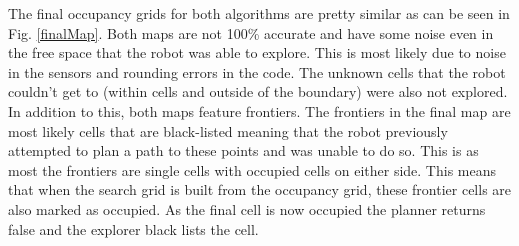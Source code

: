 \documentclass[a4paper,12pt]{article}
\begin{document}
		The final occupancy grids for both algorithms are pretty similar as can be seen in Fig. \ref{finalMap}. Both maps are not 100\% accurate  and have some noise even in the free space that the robot was able to explore. This is most likely due to noise in the sensors and rounding errors in the code. The unknown cells that the robot couldn't get to (within cells and outside of the boundary) were also not explored. In addition to this, both maps feature frontiers. The frontiers in the final map are most likely cells that are black-listed meaning that the robot previously attempted to plan a path to these points and was unable to do so. This is as most the frontiers are single cells with occupied cells on either side. This means that when the search grid is built from the occupancy grid, these frontier cells are also marked as occupied. As the final cell is now occupied the planner returns false and the explorer black lists the cell.
\end{document}
